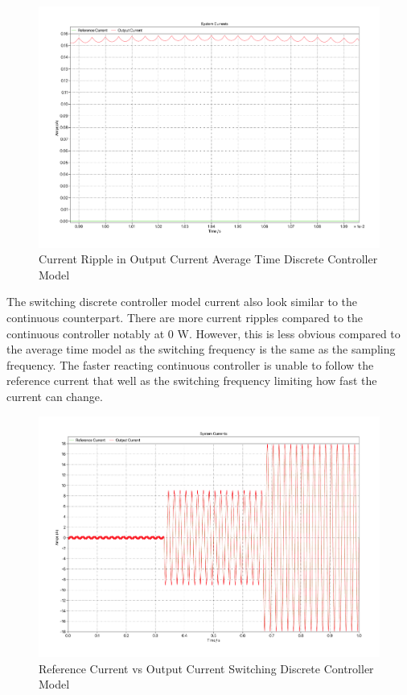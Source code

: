 \documentclass[12pt]{article}
\begin{document}
\begin{figure}[ht]
    \centering{}
    \includegraphics[width=\textwidth, height=0.4\textheight, keepaspectratio]{img/Average Time Z-C Ripple.pdf}
    \caption{Current Ripple in Output Current Average Time Discrete Controller Model}
    \label{fig:avg-time-z-c-current-ripple}
\end{figure}

The switching discrete controller model current also look similar to the continuous counterpart.
There are more current ripples compared to the continuous controller notably at 0 W.
However, this is less obvious compared to the average time model as the switching frequency is the same as the sampling frequency.
The faster reacting continuous controller is unable to follow the reference current that well as the switching frequency limiting how fast the current can change.

\begin{figure}[ht]
    \centering{}
    \includegraphics[width=\textwidth, height=0.4\textheight, keepaspectratio]{img/Switching Z-C Current.pdf}
    \caption{Reference Current vs Output Current Switching Discrete Controller Model}
    \label{fig:switching-z-c-current}
\end{figure}
\end{document}
